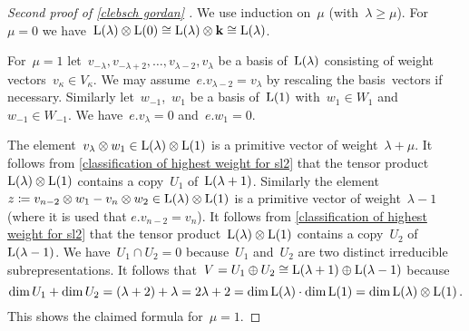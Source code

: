 \begin{proof}[Second proof of \cref{clebsch gordan} {\cite[\S 1.4]{lectures_on_sl2_modules}}]
  We use induction on~$\mu$ (with~$\lambda \geq \mu$).
  For~$\mu = 0$ we have~$\operatorname{L}(\lambda) \otimes \operatorname{L}(0) \cong \operatorname{L}(\lambda) \otimes \mathbf{k} \cong \operatorname{L}(\lambda)$.
  
  For~$\mu = 1$ let~$v_{-\lambda}, v_{-\lambda+2}, \dotsc, v_{\lambda-2}, v_\lambda$ be a basis of~$\operatorname{L}(\lambda)$ consisting of weight vectors~$v_\kappa \in V_\kappa$.
  We may assume~$e.v_{\lambda-2} = v_\lambda$ by rescaling the basis~vectors if necessary.
  Similarly let~$w_{-1}$,~$w_1$ be a basis of~$\operatorname{L}(1)$ with~$w_1 \in W_1$ and~$w_{-1} \in W_{-1}$.
  We have~$e.v_\lambda = 0$ and~$e.w_1 = 0$.
  
  The element~$v_\lambda \otimes w_1 \in \operatorname{L}(\lambda) \otimes \operatorname{L}(1)$ is a primitive vector of weight~$\lambda + \mu$.
  It follows from \cref{classification of highest weight for sl2} that the tensor product~$\operatorname{L}(\lambda) \otimes \operatorname{L}(1)$ contains a copy~$U_1$ of~$\operatorname{L}(\lambda+1)$.
  Similarly the element~$z \coloneqq v_{n-2} \otimes w_1 - v_n \otimes w_2 \in \operatorname{L}(\lambda) \otimes \operatorname{L}(1)$ is a primitive vector of weight~$\lambda - 1$ (where it is used that $e.v_{n-2} = v_n$).
  It follows from \cref{classification of highest weight for sl2} that the tensor product~$\operatorname{L}(\lambda) \otimes \operatorname{L}(1)$ contains a copy~$U_2$ of~$\operatorname{L}(\lambda-1)$.
  We have~$U_1 \cap U_2 = 0$ because~$U_1$ and~$U_2$ are two distinct irreducible subrepresentations.
  It follows that~$V = U_1 \oplus U_2 \cong \operatorname{L}(\lambda+1) \oplus \operatorname{L}(\lambda-1)$ because
  \[
    \dim U_1 + \dim U_2
    =
    (\lambda+2) + \lambda
    =
    2\lambda + 2
    =
    \dim \operatorname{L}(\lambda) \cdot \dim \operatorname{L}(1)
    =
    \dim \operatorname{L}(\lambda) \otimes \operatorname{L}(1)  \,.
  \]
  This shows the claimed formula for~$\mu = 1$.
  

\end{proof}

